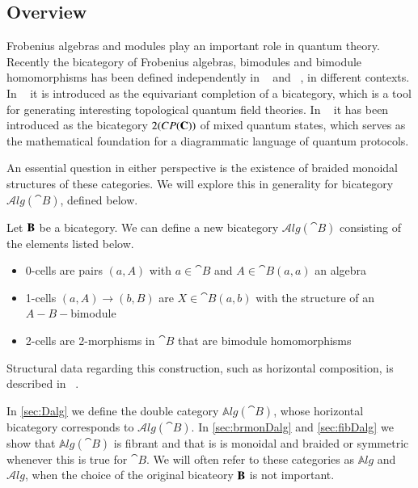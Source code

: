 \documentclass{amsart}
\begin{document}
\subsection{Overview}
Frobenius algebras and modules play an important role in quantum theory. Recently the bicategory of Frobenius algebras, bimodules and bimodule homomorphisms has been defined independently in ~\cite{carquevillerunkel} and ~\cite{heunenvicarywester}, in different contexts. In ~\cite{carquevillerunkel} it is introduced as the equivariant completion of a bicategory, which is a tool for generating interesting topological quantum field theories. In ~\cite{heunenvicarywester} it has been introduced as the bicategory $2(CP({\bf C}))$ of mixed quantum states, which serves as the mathematical foundation for a diagrammatic language of quantum protocols. 

An essential question in either perspective is the existence of braided monoidal structures of these categories. We will explore this in generality for bicategory $\mathcal{A}lg({\cat B})$, defined below.

\begin{defn}
Let ${\bf B}$ be a bicategory. We can define a new bicategory $\mathcal{A}lg({\cat B})$ consisting of the elements listed below.

\begin{itemize}
\item 0-cells are pairs $(a,A)$ with $a \in {\cat B}$ and $A \in {\cat B}(a,a)$ an algebra
\item 1-cells $(a,A) \rightarrow (b,B)$ are $X \in {\cat B}(a,b)$ with the structure of an $A-B-$bimodule
\item 2-cells are 2-morphisms in ${\cat B}$ that are bimodule homomorphisms
\end{itemize}
Structural data regarding this construction, such as horizontal composition, is described in ~\cite{carquevillerunkel}. 
\end{defn}

In \ref{sec:Dalg} we define the double category $\mathbb{A}lg({\cat B})$, whose horizontal bicategory corresponds to $\mathcal{A}lg({\cat B})$.  In \ref{sec:brmonDalg} and \ref{sec:fibDalg} we show that $\mathbb{A}lg({\cat B})$ is fibrant and that is is monoidal and braided or symmetric whenever this is true for ${\cat B}$. 
We will often refer to these categories as $\mathbb{A}lg$ and $\mathcal{A}lg$, when the choice of the original bicateory ${\bf B}$ is not important.
\end{document}
